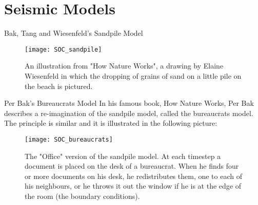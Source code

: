 \section{Seismic Models}


\begin{frame}{Bak, Tang and Wiesenfeld's Sandpile Model}
\begin{figure}[!h]
  \centering
  \texttt{[image: SOC\_sandpile]}
  \caption{An illustration from "How Nature Works", a drawing by Elaine Wiesenfeld in which the dropping of grains of sand on a little pile on the beach is pictured.}
  \label{fig:driverBlock}
\end{figure}
\end{frame}

\begin{comment}
\begin{frame}
The model is described as a two-dimensional sandpile, a cellular automaton comprising of interactions of an integer variable $z$ (number of sand grains in a site) with it's nearest neighbours. A grid of sites is created, with boundary conditions $z=0$. The sites are updated at random by dropping sand on them, and when $z>K$ (a threshold value) redistribution occurs:
\begin{align}
&z(x,y) \to z(x,y)-4, \\
&z(x\pm 1,y) \to z(x \pm 1,y)+1, \\
&z(x,y\pm 1) \to z(x,y\pm 1)+1.
\end{align}
The site is initiated with random values for each site $z>>K$ and it evolves until it stops $z<K$. \par
Simulations show that the distribution of cluster sizes and time scales follow power-law distributions.\par 
The self-organized critical state of minimally stable clusters is very robust on all length scales and they create fluctuations on all time scales.
\end{frame}
\end{comment}


\begin{frame}{Per Bak's Bureaucrats Model}
In his famous book, How Nature Works, Per Bak describes a re-imagination of the sandpile model, called the bureaucrats model. The principle is similar and it is illustrated in the following picture:

\begin{figure}[!h]
  \centering
  \texttt{[image: SOC\_bureaucrats]}
  \caption{The "Office" version of the sandpile model. At each timestep a document is placed on the desk of a bureaucrat. When he finds four or more documents on his desk, he redistributes them, one to each of his neighbours, or he throws it out the window if he is at the edge of the room (the boundary conditions).}
  \label{fig:bureaucrats}
\end{figure}
\end{frame}


